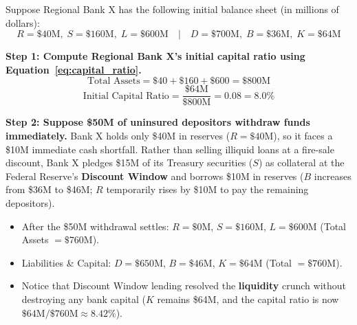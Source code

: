 \documentclass[11pt, oneside]{book}
\begin{document}
\begin{workitout}
Suppose Regional Bank X has the following initial balance sheet (in millions of dollars):
\[
  R = \$40\text{M},\; S = \$160\text{M},\; L = \$600\text{M} \quad|\quad
  D = \$700\text{M},\; B = \$36\text{M},\; K = \$64\text{M}
\]

\textbf{Step 1: Compute Regional Bank X's initial capital ratio using Equation~\eqref{eq:capital_ratio}.}
\[
  \text{Total Assets} = \$40 + \$160 + \$600 = \$800\text{M}
\]
\[
  \text{Initial Capital Ratio} = \frac{\$64\text{M}}{\$800\text{M}} = 0.08 = 8.0\%
\]

\textbf{Step 2: Suppose \$50M of uninsured depositors withdraw funds immediately.}
Bank X holds only \$40M in reserves ($R = \$40\text{M}$), so it faces a \$10M immediate cash shortfall. Rather than selling illiquid loans at a fire-sale discount, Bank X pledges \$15M of its Treasury securities ($S$) as collateral at the Federal Reserve's \textbf{Discount Window} and borrows \$10M in reserves ($B$ increases from \$36M to \$46M; $R$ temporarily rises by \$10M to pay the remaining depositors).
\begin{itemize}[leftmargin=1.5em, itemsep=2pt]
  \item After the \$50M withdrawal settles: $R = \$0\text{M}$, $S = \$160\text{M}$, $L = \$600\text{M}$ (Total Assets $= \$760\text{M}$).
  \item Liabilities \& Capital: $D = \$650\text{M}$, $B = \$46\text{M}$, $K = \$64\text{M}$ (Total $= \$760\text{M}$).
  \item Notice that Discount Window lending resolved the \textbf{liquidity} crunch without destroying any bank capital ($K$ remains \$64M, and the capital ratio is now $\$64\text{M} / \$760\text{M} \approx 8.42\%$).
\end{itemize}
\end{workitout}
\end{document}
